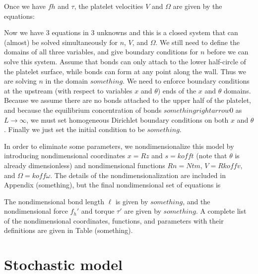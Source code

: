 Once we have $fh$ and $\tau$, the platelet velocities $V$ and $\Omega$
are given by the equations: %

Now we have 3 equations in 3 unknowns and this is a closed system that
can (almost) be solved simultaneously for $n$, $V$, and $\Omega$. We
still need to define the domains of all three variables, and give
boundary conditions for $n$ before we can solve this system. Assume
that bonds can only attach to the lower half-circle of the platelet
surface, while bonds can form at any point along the wall. Thus we are
solving $n$ in the domain $something$. We need to enforce boundary
conditions at the upstream (with respect to variables $x$ and
$\theta$) ends of the $x$ and $\theta$ domains. Because we assume
there are no bonds attached to the upper half of the platelet, and
because the equilibrium concentration of bonds $something rightarrow
0$ as $L \rightarrow \infty$, we must set homogeneous Dirichlet
boundary conditions on both $x$ and $\theta$. Finally we just set the
initial condition to be $something$.

In order to eliminate some parameters, we nondimensionalize this model
by introducing nondimensional coordinates $x = Rz$ and $s = koff t$
(note that $\theta$ is already dimensionless) and nondimensional
functions $R n = Nt m$, $V = R koff v$, and $\Omega = koff
\omega$. The details of the nondimensionalization are included in
Appendix (something), but the final nondimensional set of equations is

The nondimensional bond length $\ell$ is given by $something$, and the
nondimensional force $f_h'$ and torque $\tau'$ are given by
$something$. A complete list of the nondimensional coordinates,
functions, and parameters with their definitions are given in Table
(something).

\section{Stochastic model}
\label{sec:stochastic-model}


